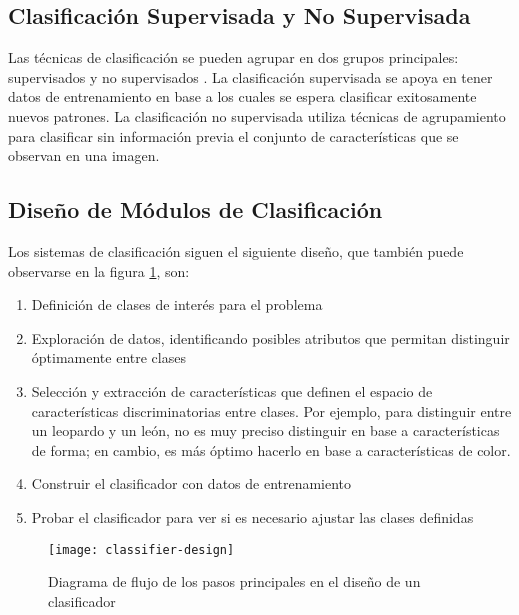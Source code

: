 \subsection{Clasificación Supervisada y No Supervisada}
Las técnicas de clasificación se pueden agrupar en dos grupos principales: supervisados y no supervisados \parencite{Solomon2011-xz}. 
La clasificación supervisada se apoya en tener datos de entrenamiento en base a los cuales se espera clasificar exitosamente nuevos patrones.
La clasificación no supervisada utiliza técnicas de agrupamiento para clasificar sin información previa el conjunto de características que se observan en una imagen. 

\subsection{Diseño de Módulos de Clasificación }

Los sistemas de clasificación siguen el siguiente diseño, que también puede observarse en la figura \ref{fig:classifier-design}, son: 
\begin{enumerate}
    \item Definición de clases de interés para el problema
\item Exploración de datos, identificando posibles atributos que permitan distinguir óptimamente entre clases
\item Selección y extracción de características que definen el espacio de características discriminatorias entre clases. Por ejemplo, para distinguir entre un leopardo y un león, no es muy preciso distinguir en base a características de forma; en cambio, es más óptimo hacerlo en base a características de color.
\item Construir el clasificador con datos de entrenamiento
\item Probar el clasificador para ver si es necesario ajustar las clases definidas
\end{enumerate}

    \begin{figure}[H]
        \centering
        \texttt{[image: classifier-design]}
        \caption{Diagrama de flujo de los pasos principales en el diseño de un clasificador \parencite{Solomon2011-xz}}
        \label{fig:classifier-design}
    \end{figure}
    

